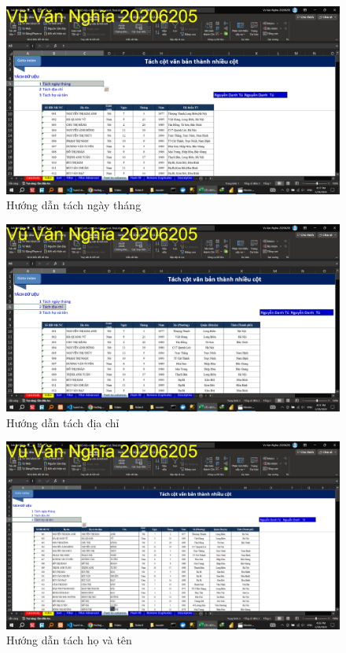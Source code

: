 \documentclass{article}
\begin{document}
\begin{figure}[h]
\centering
\includegraphics[scale = 0.15]{Video1/HuongDan/8.png}
\caption{Hướng dẫn tách ngày tháng}
\end{figure}
\begin{figure}[h]
\centering
\includegraphics[scale = 0.15]{Video1/HuongDan/9.png}
\caption{Hướng dẫn tách địa chỉ}
\end{figure}
\begin{figure}[h]
\centering
\includegraphics[scale = 0.15]{Video1/HuongDan/10.png}
\caption{Hướng dẫn tách họ và tên}
\end{figure}
\end{document}

